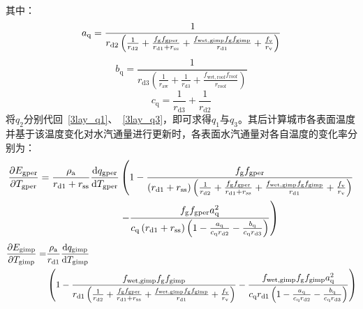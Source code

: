 其中：
\begin{equation}
  a_{\mathrm{q}}= \frac{1}{r_{\mathrm{d2}} \left( \frac{1}{r_{\mathrm{d2}}} + \frac{f_{\mathrm{g}} f_{\mathrm{gper}}}{r_{\mathrm{d1}} + r_{\mathrm{ss}}} + \frac{f_{\mathrm{wet,gimp}} f_{\mathrm{g}} f_{\mathrm{gimp}}}{r_{\mathrm{d1}}}+\frac{f_{\rm v}}{r_{\mathrm{v}}} \right)}
\end{equation}
%
\begin{equation}
  b_{\mathrm{q}} = \frac{1}{r_{\mathrm{d3}} \left( \frac{1}{r_{\mathrm{aw}}} + \frac{1}{r_{\mathrm{d3}}} + \frac{f_{\mathrm{wet,roof}} f_{\mathrm{roof}}}{r_{\mathrm{roof}}} \right)}
\end{equation}
%
\begin{equation}
  c_{\mathrm{q}} = \frac{1}{r_{\mathrm{d3}}} + \frac{1}{r_{\mathrm{d2}}}
\end{equation}
将$q_{2}$分别代回~\eqref{3lay_q1}、~\eqref{3lay_q3}，即可求得$q_{1}$与$q_{3}$。其后计算城市各表面温度并基于该温度变化对水汽通量进行更新时，各表面水汽通量对各自温度的变化率分别为：
\begin{equation}
  \begin{split}
    \frac{\partial  E_{\mathrm{gper}}}{\partial T_{\mathrm{gper}}} =\frac{\rho _{\rm a}}{r_{\mathrm{d1}}+r_{\mathrm{ss}}} \frac{{\mathrm {d}} q_{\mathrm{gper}}}{{\mathrm {d}} T_{\mathrm{gper}}} &\left(1-\frac{f_{\mathrm{g}}f_{\mathrm{gper}}}{\left(r_{\mathrm{d1}}+r_{\mathrm{ss}}\right) \left(\frac{1}{r_{\mathrm{d2}}} + \frac{f_{\mathrm{g}} f_{\mathrm{gper}}}{r_{\mathrm{d1}} + r_{\mathrm{ss}}} + \frac{f_{\mathrm{wet,gimp}} f_{\mathrm{g}} f_{\mathrm{gimp}}}{r_{\mathrm{d1}}}+\frac{f_{\rm v}}{r_{\mathrm{v}}}\right)}  \right. \\
    & \left. - \frac{f_{\mathrm{g}} f_{\mathrm{gper}} a_{\mathrm{q}}^2}{c_{\mathrm{q}}\left(r_{\mathrm{d1}}+r_{\mathrm{ss}}\right) \left( 1 - \frac{a_{\mathrm{q}}}{c_{\mathrm{q}} r_{\mathrm{d2}}} - \frac{b_{\mathrm{q}}}{c_{\mathrm{q}} r_{\mathrm{d3}}} \right)}\right)
  \end{split}
\end{equation}
%
\begin{equation}
  \begin{split}
    \frac{\partial  E_{\mathrm{gimp}}}{\partial T_{\mathrm{gimp}}} = &\frac{\rho _{\rm a}}{r_{\mathrm{d1}}} \frac{{\mathrm {d}} q_{\mathrm{gimp}}}{{\mathrm {d}} T_{\mathrm{gimp}}} \\
    &\left(1-\frac{f_{\mathrm{wet,gimp}}f_{\mathrm{g}}f_{\mathrm{gimp}}}{r_{\mathrm{d1}} \left(\frac{1}{r_{\mathrm{d2}}} + \frac{f_{\mathrm{g}} f_{\mathrm{gper}}}{r_{\mathrm{d1}} + r_{\mathrm{ss}}} + \frac{f_{\mathrm{wet,gimp}} f_{\mathrm{g}} f_{\mathrm{gimp}}}{r_{\mathrm{d1}}}+\frac{f_{\rm v}}{r_{\mathrm{v}}}\right)} - \frac{f_{\mathrm{wet,gimp}} f_{\mathrm{g}} f_{\mathrm{gimp}} a_{\mathrm{q}}^2}{c_{\mathrm{q}} r_{\mathrm{d1}}\left( 1 - \frac{a_{\mathrm{q}}}{c_{\mathrm{q}} r_{\mathrm{d2}}} - \frac{b_{\mathrm{q}}}{c_{\mathrm{q}} r_{\mathrm{d3}}} \right)}\right)
  \end{split}
\end{equation}
